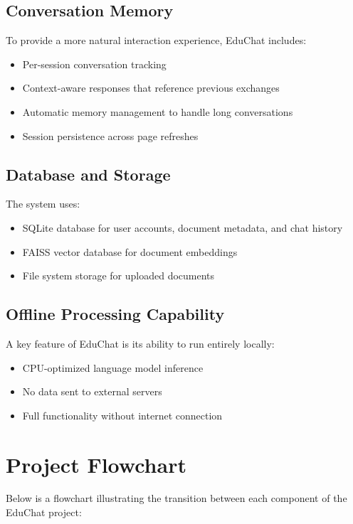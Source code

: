 \documentclass[12pt]{article}
\begin{document}
\subsection{Conversation Memory}
To provide a more natural interaction experience, EduChat includes:
\begin{itemize}[leftmargin=2em]
    \item Per-session conversation tracking
    \item Context-aware responses that reference previous exchanges
    \item Automatic memory management to handle long conversations
    \item Session persistence across page refreshes
\end{itemize}

\subsection{Database and Storage}
The system uses:
\begin{itemize}[leftmargin=2em]
    \item SQLite database for user accounts, document metadata, and chat history
    \item FAISS vector database for document embeddings
    \item File system storage for uploaded documents
\end{itemize}

\subsection{Offline Processing Capability}
A key feature of EduChat is its ability to run entirely locally:
\begin{itemize}[leftmargin=2em]
    \item CPU-optimized language model inference
    \item No data sent to external servers
    \item Full functionality without internet connection
\end{itemize}

\section{Project Flowchart}
Below is a flowchart illustrating the transition between each component of the EduChat project:
\end{document}
